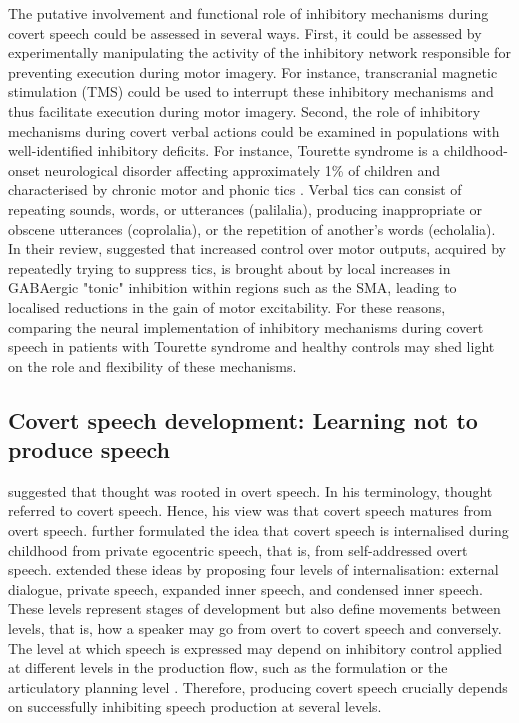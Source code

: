 \documentclass[utf8]{template/frontiersSCNS} %
\begin{document}
The putative involvement and functional role of inhibitory mechanisms during covert speech could be assessed in several ways. First, it could be assessed by experimentally manipulating the activity of the inhibitory network responsible for preventing execution during motor imagery. For instance, transcranial magnetic stimulation (TMS) could be used to interrupt these inhibitory mechanisms and thus facilitate execution during motor imagery. Second, the role of inhibitory mechanisms during covert verbal actions could be examined in populations with well-identified inhibitory deficits. For instance, Tourette syndrome is a childhood-onset neurological disorder affecting approximately 1\% of children and characterised by chronic motor and phonic tics \citep{jackson_inhibition_2015}. Verbal tics can consist of repeating sounds, words, or utterances (palilalia), producing inappropriate or obscene utterances (coprolalia), or the repetition of another’s words (echolalia). In their review, \cite{jackson_inhibition_2015} suggested that increased control over motor outputs, acquired by repeatedly trying to suppress tics, is brought about by local increases in GABAergic "tonic" inhibition within regions such as the SMA, leading to localised reductions in the gain of motor excitability. For these reasons, comparing the neural implementation of inhibitory mechanisms during covert speech in patients with Tourette syndrome and healthy controls may shed light on the role and flexibility of these mechanisms.

\subsection{Covert speech development: Learning not to produce speech}

\cite{watson_psychology_1919} suggested that thought was rooted in overt speech. In his terminology, thought referred to covert speech. Hence, his view was that covert speech matures from overt speech. \cite{vygotsky_thought_1934} further formulated the idea that covert speech is internalised during childhood from private egocentric speech, that is, from self-addressed overt speech. \cite{fernyhough_alien_2004} extended these ideas by proposing four levels of internalisation: external dialogue, private speech, expanded inner speech, and condensed inner speech. These levels represent stages of development but also define movements between levels, that is, how a speaker may go from overt to covert speech and conversely. The level at which speech is expressed may depend on inhibitory control applied at different levels in the production flow, such as the formulation or the articulatory planning level \citep{grandchamp_condialint_2019}. Therefore, producing covert speech crucially depends on successfully inhibiting speech production at several levels. 
\end{document}
